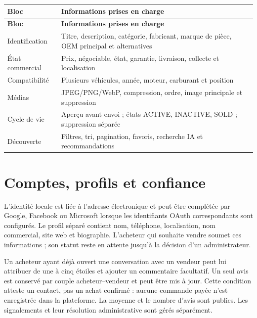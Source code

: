 {\small\singlespacing{}
\begin{longtable}{|>{\raggedright\arraybackslash}p{}|>{\raggedright\arraybackslash}p{}|}
\hline
\rowcolor{tablehead} \color{white}\bfseries Bloc & \color{white}\bfseries Informations prises en charge \\ \hline
\endfirsthead
\rowcolor{tablehead} \color{white}\bfseries Bloc & \color{white}\bfseries Informations prises en charge \\ \hline
\endhead
\hline\endfoot
Identification & Titre, description, catégorie, fabricant, marque de pièce, OEM principal et alternatives \\ \hline
\rowcolor{tablerow} État commercial & Prix, négociable, état, garantie, livraison, collecte et localisation \\ \hline
Compatibilité & Plusieurs véhicules, année, moteur, carburant et position \\ \hline
\rowcolor{tablerow} Médias & JPEG/PNG/WebP, compression, ordre, image principale et suppression \\ \hline
Cycle de vie & Aperçu avant envoi ; états ACTIVE, INACTIVE, SOLD ; suppression séparée \\ \hline
\rowcolor{tablerow} Découverte & Filtres, tri, pagination, favoris, recherche IA et recommandations \\ \hline
\end{longtable}
}


\section{Comptes, profils et confiance}

L'identité locale est liée à l'adresse électronique et peut être complétée par Google, Facebook ou Microsoft lorsque les identifiants OAuth correspondants sont configurés. Le profil séparé contient nom, téléphone, localisation, nom commercial, site web et biographie. L'acheteur qui souhaite vendre soumet ces informations ; son statut reste en attente jusqu'à la décision d'un administrateur.


Un acheteur ayant déjà ouvert une conversation avec un vendeur peut lui attribuer de une à cinq étoiles et ajouter un commentaire facultatif. Un seul avis est conservé par couple acheteur--vendeur et peut être mis à jour. Cette condition atteste un contact, pas un achat confirmé : aucune commande payée n'est enregistrée dans la plateforme. La moyenne et le nombre d'avis sont publics. Les signalements et leur résolution administrative sont gérés séparément.


